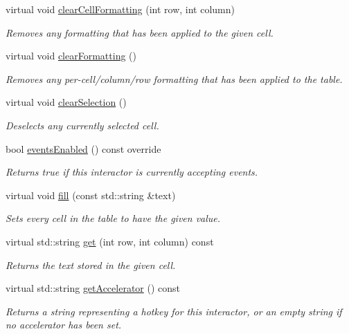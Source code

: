 \begin{DoxyCompactItemize}
virtual void \mbox{\hyperlink{classsgl_1_1GTable_a5ba4fe558e9d315c123ecd9e896065ca}{clear\+Cell\+Formatting}} (int row, int column)
\begin{DoxyCompactList}\small\item\em Removes any formatting that has been applied to the given cell. \end{DoxyCompactList}\item 
virtual void \mbox{\hyperlink{classsgl_1_1GTable_a07ea41be0cdc43ffcd09898d3ae5c523}{clear\+Formatting}} ()
\begin{DoxyCompactList}\small\item\em Removes any per-\/cell/column/row formatting that has been applied to the table. \end{DoxyCompactList}\item 
virtual void \mbox{\hyperlink{classsgl_1_1GTable_abd07e172ccec6823a88289c21124a367}{clear\+Selection}} ()
\begin{DoxyCompactList}\small\item\em Deselects any currently selected cell. \end{DoxyCompactList}\item 
bool \mbox{\hyperlink{classsgl_1_1GInteractor_a597a370b592e3737d38d9d2f4e2031ea}{events\+Enabled}} () const override
\begin{DoxyCompactList}\small\item\em Returns true if this interactor is currently accepting events. \end{DoxyCompactList}\item 
virtual void \mbox{\hyperlink{classsgl_1_1GTable_a1ff40d0915f96652929cfb739bdd969f}{fill}} (const std\+::string \&text)
\begin{DoxyCompactList}\small\item\em Sets every cell in the table to have the given value. \end{DoxyCompactList}\item 
virtual std\+::string \mbox{\hyperlink{classsgl_1_1GTable_aaa9971dcb7e1b082abd3b9010667f041}{get}} (int row, int column) const
\begin{DoxyCompactList}\small\item\em Returns the text stored in the given cell. \end{DoxyCompactList}\item 
virtual std\+::string \mbox{\hyperlink{classsgl_1_1GInteractor_a69f8d23ed8f207fbecad99960776e942}{get\+Accelerator}} () const
\begin{DoxyCompactList}\small\item\em Returns a string representing a hotkey for this interactor, or an empty string if no accelerator has been set. \end{DoxyCompactList}\item 

\end{DoxyCompactItemize}
